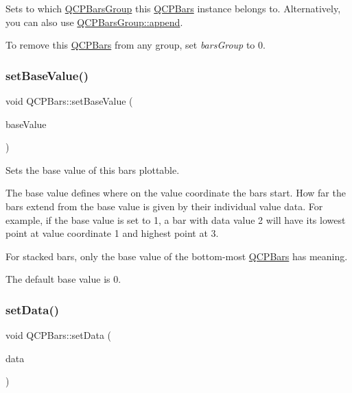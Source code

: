 Sets to which \hyperlink{class_q_c_p_bars_group}{Q\+C\+P\+Bars\+Group} this \hyperlink{class_q_c_p_bars}{Q\+C\+P\+Bars} instance belongs to. Alternatively, you can also use \hyperlink{class_q_c_p_bars_group_a809ed63cc4ff7cd5b0b8c96b470163d3}{Q\+C\+P\+Bars\+Group\+::append}.

To remove this \hyperlink{class_q_c_p_bars}{Q\+C\+P\+Bars} from any group, set {\itshape bars\+Group} to 0. \mbox{\label{class_q_c_p_bars_a574ec7eb7537566df1a28ff085d75623}} 
\subsubsection{\texorpdfstring{set\+Base\+Value()}{setBaseValue()}}
{\footnotesize\ttfamily void Q\+C\+P\+Bars\+::set\+Base\+Value (\begin{DoxyParamCaption}\item[{double}]{base\+Value }\end{DoxyParamCaption})}

Sets the base value of this bars plottable.

The base value defines where on the value coordinate the bars start. How far the bars extend from the base value is given by their individual value data. For example, if the base value is set to 1, a bar with data value 2 will have its lowest point at value coordinate 1 and highest point at 3.

For stacked bars, only the base value of the bottom-\/most \hyperlink{class_q_c_p_bars}{Q\+C\+P\+Bars} has meaning.

The default base value is 0. \mbox{\label{class_q_c_p_bars_a6dc562ec7120a8521e1061f2134367e4}} 
\subsubsection{\texorpdfstring{set\+Data()}{setData()}\hspace{0.1cm}{\footnotesize\ttfamily [1/2]}}
{\footnotesize\ttfamily void Q\+C\+P\+Bars\+::set\+Data (\begin{DoxyParamCaption}\item[{Q\+Shared\+Pointer$<$ \hyperlink{qcustomplot_8h_a52bf589c9fce1baa36c1d40d69785d46}{Q\+C\+P\+Bars\+Data\+Container} $>$}]{data }\end{DoxyParamCaption})}

